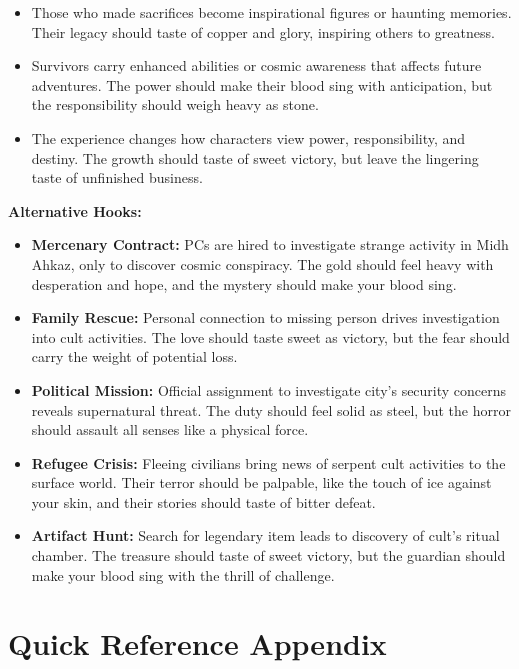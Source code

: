 \documentclass[11pt]{article}
\begin{document}
\begin{itemize}
\begin{itemize}
  \item Those who made sacrifices become inspirational figures or haunting memories. Their legacy should taste of copper and glory, inspiring others to greatness.
  \item Survivors carry enhanced abilities or cosmic awareness that affects future adventures. The power should make their blood sing with anticipation, but the responsibility should weigh heavy as stone.
  \item The experience changes how characters view power, responsibility, and destiny. The growth should taste of sweet victory, but leave the lingering taste of unfinished business.
  \end{itemize}
\end{itemize}

\textbf{Alternative Hooks:}
\begin{itemize}
\item \textbf{Mercenary Contract:} PCs are hired to investigate strange activity in Midh Ahkaz, only to discover cosmic conspiracy. The gold should feel heavy with desperation and hope, and the mystery should make your blood sing.
\item \textbf{Family Rescue:} Personal connection to missing person drives investigation into cult activities. The love should taste sweet as victory, but the fear should carry the weight of potential loss.
\item \textbf{Political Mission:} Official assignment to investigate city's security concerns reveals supernatural threat. The duty should feel solid as steel, but the horror should assault all senses like a physical force.
\item \textbf{Refugee Crisis:} Fleeing civilians bring news of serpent cult activities to the surface world. Their terror should be palpable, like the touch of ice against your skin, and their stories should taste of bitter defeat.
\item \textbf{Artifact Hunt:} Search for legendary item leads to discovery of cult's ritual chamber. The treasure should taste of sweet victory, but the guardian should make your blood sing with the thrill of challenge.
\end{itemize}

\section{Quick Reference Appendix}
\end{document}

